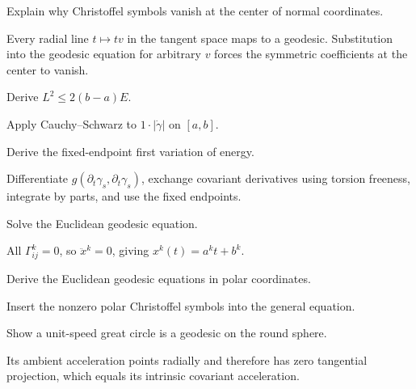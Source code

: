\begin{problem}\label{prob:vii23-04}
Explain why Christoffel symbols vanish at the center of normal coordinates.
\end{problem}
\begin{solution}
Every radial line \(t\mapsto tv\) in the tangent space maps to a geodesic. Substitution into the geodesic equation for arbitrary \(v\) forces the symmetric coefficients at the center to vanish.
\end{solution}


\begin{problem}\label{prob:vii23-05}
Derive \(L^2\le2(b-a)E\).
\end{problem}
\begin{solution}
Apply Cauchy--Schwarz to \(1\cdot|\dot\gamma|\) on \([a,b]\).
\end{solution}


\begin{problem}\label{prob:vii23-06}
Derive the fixed-endpoint first variation of energy.
\end{problem}
\begin{solution}
Differentiate \(g(\partial_t\gamma_s,\partial_t\gamma_s)\), exchange covariant derivatives using torsion freeness, integrate by parts, and use the fixed endpoints.
\end{solution}


\begin{problem}\label{prob:vii23-07}
Solve the Euclidean geodesic equation.
\end{problem}
\begin{solution}
All \(\Gamma^k_{ij}=0\), so \(\ddot x^k=0\), giving \(x^k(t)=a^kt+b^k\).
\end{solution}


\begin{problem}\label{prob:vii23-08}
Derive the Euclidean geodesic equations in polar coordinates.
\end{problem}
\begin{solution}
Insert the nonzero polar Christoffel symbols into the general equation.
\end{solution}


\begin{problem}\label{prob:vii23-09}
Show a unit-speed great circle is a geodesic on the round sphere.
\end{problem}
\begin{solution}
Its ambient acceleration points radially and therefore has zero tangential projection, which equals its intrinsic covariant acceleration.
\end{solution}


